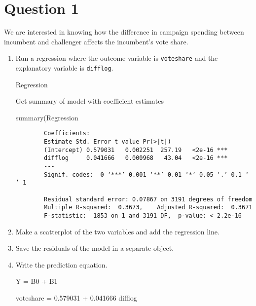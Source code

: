 \documentclass[12pt,letterpaper]{article}
\begin{document}
\section*{Question 1}
\vspace{.25cm}
\noindent We are interested in knowing how the difference in campaign spending between incumbent and challenger affects the incumbent's vote share. 
	\begin{enumerate}
		\item Run a regression where the outcome variable is \texttt{voteshare} and the explanatory variable is \texttt{difflog}.	\vspace{1cm}
		
			
		Regression%
		
		Get summary of model with coefficient estimates
		
		summary(Regression%
		
		\begin{verbatim}
		Coefficients:
		Estimate Std. Error t value Pr(>|t|)    
		(Intercept) 0.579031   0.002251  257.19   <2e-16 ***
		difflog     0.041666   0.000968   43.04   <2e-16 ***
		---
		Signif. codes:  0 ‘***’ 0.001 ‘**’ 0.01 ‘*’ 0.05 ‘.’ 0.1 ‘ ’ 1
		
		Residual standard error: 0.07867 on 3191 degrees of freedom
		Multiple R-squared:  0.3673,	Adjusted R-squared:  0.3671 
		F-statistic:  1853 on 1 and 3191 DF,  p-value: < 2.2e-16
			\end{verbatim}
	
		
		\item Make a scatterplot of the two variables and add the regression line. 	\vspace{7cm}
		\item Save the residuals of the model in a separate object.	\vspace{7cm}
		\item Write the prediction equation.
		
			Y = B0 + B1
		
		voteshare = 0.579031 + 0.041666 difflog
		
	\end{enumerate}
	
	
	
\newpage
\end{document}
